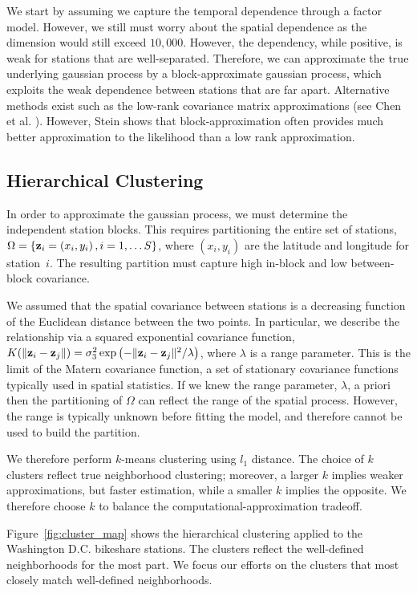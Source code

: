 \documentclass{acm_proc_article-sp}
\begin{document}
We start by assuming we capture the temporal dependence through a factor model.  However, we still must worry about the spatial dependence as the dimension would still exceed $10,000$.   However, the dependency, while positive, is weak for stations that are well-separated.  Therefore, we can approximate the true underlying gaussian process by a block-approximate gaussian process, which exploits the weak dependence between stations that are far apart.  Alternative methods exist such as the low-rank covariance matrix approximations (see Chen et al. \cite{chen:lowrank}).  However, Stein \cite{stein:spatial} shows that block-approximation often provides much better approximation to the likelihood than a low rank approximation.

\subsection{Hierarchical Clustering}\label{clustering}
In order to approximate the gaussian process, we must determine the independent station blocks.  This requires partitioning the entire set of stations, $\Omega = \{ {\bf z}_i = (x_i, y_i) \, , i = 1,\ldots S\}$, where $(x_i, y_i)$ are the latitude and longitude for station~$i$. The resulting partition must capture high in-block and low between-block covariance.  

We assumed that the spatial covariance between stations is a decreasing function of the Euclidean distance between the two points.  In particular, we describe the relationship via a squared exponential covariance function, $K(\| {\bf z}_i - {\bf z}_j \|) = \sigma_3^2 \exp \left( - \| {\bf z}_i - {\bf z}_j \|^2/ \lambda \right)$, where $\lambda$ is a range parameter.  This is the limit of the Matern covariance function, a set of stationary covariance functions typically used in spatial statistics.  If we knew the range parameter, $\lambda$, a priori then the partitioning of $\Omega$ can reflect the range of the spatial process.  However, the range is typically unknown before fitting the model, and therefore cannot be used to build the partition.

We therefore perform $k$-means clustering using $l_1$ distance.  The choice of $k$ clusters reflect true neighborhood clustering; moreover, a larger $k$ implies weaker approximations, but faster estimation, while a smaller $k$ implies the opposite.  We therefore choose $k$ to balance the computational-approximation tradeoff.

Figure~\ref{fig:cluster_map} shows the hierarchical clustering applied to the Washington D.C. bikeshare stations.  The clusters reflect the well-defined neighborhoods for the most part. We focus our efforts on the clusters that most closely match well-defined neighborhoods.
\end{document}
